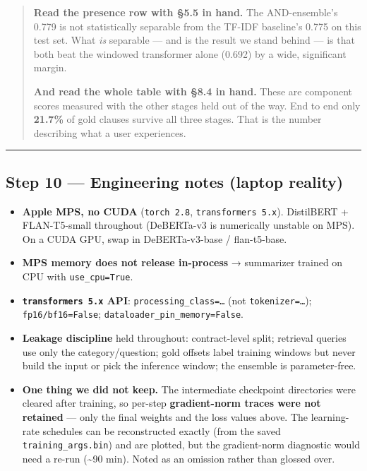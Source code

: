 \documentclass[
  10pt,
]{article}
\providecommand{\tightlist}{%
  \setlength{\itemsep}{0pt}\setlength{\parskip}{0pt}}
\begin{document}
\begin{quote}
\textbf{Read the presence row with §5.5 in hand.} The AND-ensemble's 0.779 is
not statistically separable from the TF-IDF baseline's 0.775 on this test set.
What \emph{is} separable --- and is the result we stand behind --- is that both
beat the windowed transformer alone (0.692) by a wide, significant margin.

\textbf{And read the whole table with §8.4 in hand.} These are component scores
measured with the other stages held out of the way. End to end only
\textbf{21.7\%} of gold clauses survive all three stages. That is the number
describing what a user experiences.
\end{quote}

\begin{center}\rule{0.5\linewidth}{0.5pt}\end{center}

\subsection{Step 10 --- Engineering notes (laptop reality)}

\begin{itemize}
\tightlist
\item
  \textbf{Apple MPS, no CUDA} (\texttt{torch\ 2.8}, \texttt{transformers\ 5.x}).
  DistilBERT + FLAN-T5-small throughout (DeBERTa-v3 is numerically unstable on
  MPS). On a CUDA GPU, swap in DeBERTa-v3-base / flan-t5-base.
\item
  \textbf{MPS memory does not release in-process} → summarizer trained on CPU
  with \texttt{use\_cpu=True}.
\item
  \textbf{\texttt{transformers\ 5.x} API}: \texttt{processing\_class=\ldots{}}
  (not \texttt{tokenizer=\ldots{}}); \texttt{fp16/bf16=False};
  \texttt{dataloader\_pin\_memory=False}.
\item
  \textbf{Leakage discipline} held throughout: contract-level split; retrieval
  queries use only the category/question; gold offsets label training windows
  but never build the input or pick the inference window; the ensemble is
  parameter-free.
\item
  \textbf{One thing we did not keep.} The intermediate checkpoint directories
  were cleared after training, so per-step \textbf{gradient-norm traces were not
  retained} --- only the final weights and the loss values above. The
  learning-rate schedules can be reconstructed exactly (from the saved
  \texttt{training\_args.bin}) and are plotted, but the gradient-norm diagnostic
  would need a re-run (\textasciitilde90 min). Noted as an omission rather than
  glossed over.
\end{itemize}
\end{document}
